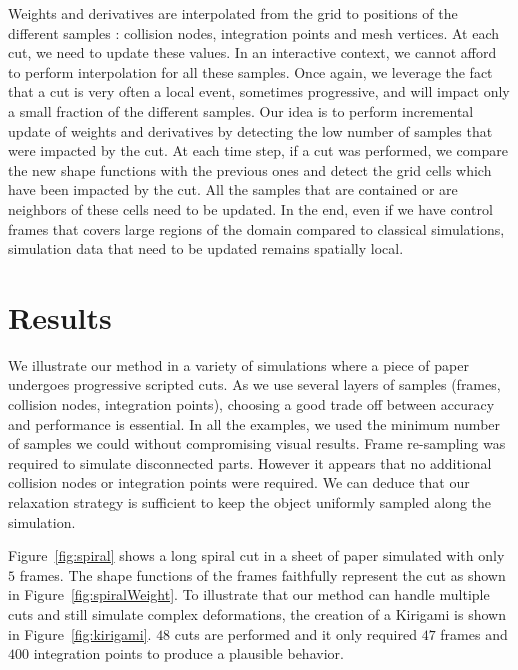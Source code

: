 Weights and derivatives are interpolated from the grid to positions of the different samples : collision nodes, integration points and mesh vertices. At each cut, we need to update these values. In an interactive context, we cannot afford to perform interpolation for all these samples. Once again, we leverage the fact that a cut is very often a local event, sometimes progressive, and will impact only a small fraction of the different samples. Our idea is to perform incremental update of weights and derivatives by detecting the low number of samples that were impacted by the cut. At each time step, if a cut was performed, we compare the new shape functions with the previous ones and detect the grid cells which have been impacted by the cut. All the samples that are contained or are neighbors of these cells need to be updated. In the end, even if we have control frames that covers large regions of the domain compared to classical simulations, simulation data that need to be updated remains spatially local.

\section{Results} \label{sec:results}

We illustrate our method in a variety of simulations where a piece of paper undergoes progressive scripted cuts. As we use several layers of samples (frames, collision nodes, integration points), choosing a good trade off between accuracy and performance is essential. In all the examples, we used the minimum number of samples we could without compromising visual results. Frame re-sampling was required to simulate disconnected parts. However it appears that no additional collision nodes or integration points were required. We can deduce that our relaxation strategy is sufficient to keep the object uniformly sampled along the simulation. 

Figure~\ref{fig:spiral} shows a long spiral cut in a sheet of paper simulated with only $5$ frames. The shape functions of the frames faithfully represent the cut as shown in Figure~\ref{fig:spiralWeight}. 
To illustrate that our method can handle multiple cuts and still simulate complex deformations, the creation of a Kirigami is shown in Figure~\ref{fig:kirigami}. $48$ cuts are performed and it only required $47$ frames and $400$ integration points to produce a plausible behavior.

